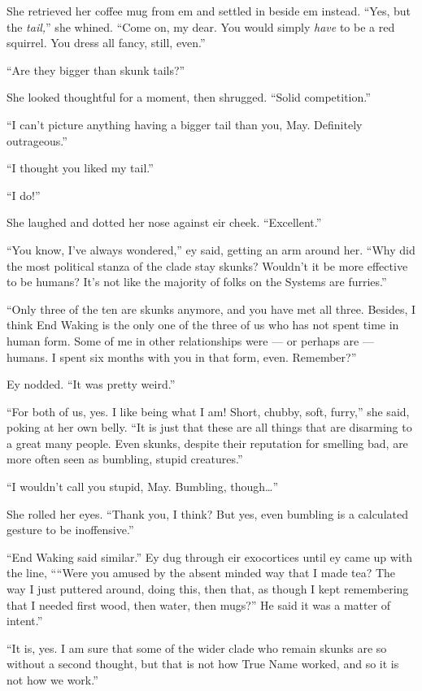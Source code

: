 She retrieved her coffee mug from em and settled in beside em instead. ``Yes, but the \emph{tail,}'' she whined. ``Come on, my dear. You would simply \emph{have} to be a red squirrel. You dress all fancy, still, even.''

``Are they bigger than skunk tails?''

She looked thoughtful for a moment, then shrugged. ``Solid competition.''

``I can't picture anything having a bigger tail than you, May. Definitely outrageous.''

``I thought you liked my tail.''

``I do!''

She laughed and dotted her nose against eir cheek. ``Excellent.''

``You know, I've always wondered,'' ey said, getting an arm around her. ``Why did the most political stanza of the clade stay skunks? Wouldn't it be more effective to be humans? It's not like the majority of folks on the Systems are furries.''

``Only three of the ten are skunks anymore, and you have met all three. Besides, I think End Waking is the only one of the three of us who has not spent time in human form. Some of me in other relationships were — or perhaps are — humans. I spent six months with you in that form, even. Remember?''

Ey nodded. ``It was pretty weird.''

``For both of us, yes. I like being what I am! Short, chubby, soft, furry,'' she said, poking at her own belly. ``It is just that these are all things that are disarming to a great many people. Even skunks, despite their reputation for smelling bad, are more often seen as bumbling, stupid creatures.''

``I wouldn't call you stupid, May. Bumbling, though\ldots{}''

She rolled her eyes. ``Thank you, I think? But yes, even bumbling is a calculated gesture to be inoffensive.''

``End Waking said similar.'' Ey dug through eir exocortices until ey came up with the line, ````Were you amused by the absent minded way that I made tea? The way I just puttered around, doing this, then that, as though I kept remembering that I needed first wood, then water, then mugs?'' He said it was a matter of intent.''

``It is, yes. I am sure that some of the wider clade who remain skunks are so without a second thought, but that is not how True Name worked, and so it is not how we work.''

